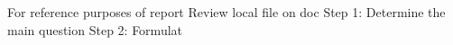 For reference purposes of report 
Review local file on doc
Step 1: Determine the main question
Step 2: Formulat
